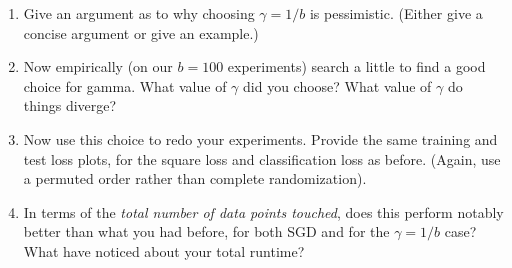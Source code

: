 \documentclass{article}
\begin{document}
\begin{enumerate}
	\item Give an argument as to why choosing $\gamma=1/b$ is pessimistic. (Either give a concise argument or give an example.)
	\item Now empirically (on our $b=100$ experiments) search a little to find a good choice for gamma. What value of $\gamma$ did you choose? What value  of $\gamma$ do things diverge?
	\item  Now use this choice to redo your experiments. Provide the same training and test loss plots, for the square loss and classification loss as before. (Again, use a permuted order rather than complete randomization).
	\item In terms of the \emph{total number of data points touched}, does this perform notably better than what you had before, for both SGD and for the $\gamma=1/b$ case? What have noticed about your total runtime?
\end{enumerate}
\end{document}
